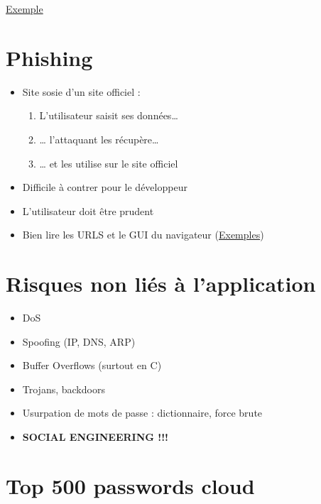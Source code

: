 \href{https://www.owasp.org/index.php/CSRF}{Exemple}

\hypertarget{phishing}{%
\section{Phishing}\label{phishing}}

\begin{itemize}
\tightlist
\item
  Site sosie d'un site officiel :

  \begin{enumerate}
  \def\labelenumi{\arabic{enumi}.}
  \tightlist
  \item
    L'utilisateur saisit ses données\ldots{}
  \item
    \ldots{} l'attaquant les récupère\ldots{}
  \item
    \ldots{} et les utilise sur le site officiel
  \end{enumerate}
\item
  Difficile à contrer pour le développeur
\item
  L'utilisateur doit être prudent
\item
  Bien lire les URLS et le GUI du navigateur
  (\href{http://kb.cadzow.com.au:15384/cadzow/details.aspx?ID=1422}{Exemples})
\end{itemize}

\hypertarget{risques-non-liuxe9s-uxe0-lapplication}{%
\section{Risques non liés à
l'application}\label{risques-non-liuxe9s-uxe0-lapplication}}

\begin{itemize}
\tightlist
\item
  DoS
\item
  Spoofing (IP, DNS, ARP)
\item
  Buffer Overflows (surtout en C)
\item
  Trojans, backdoors
\item
  Usurpation de mots de passe : dictionnaire, force brute
\item
  \textbf{SOCIAL ENGINEERING !!!}
\end{itemize}

\hypertarget{top-500-passwords-cloud}{%
\section{Top 500 passwords cloud}\label{top-500-passwords-cloud}}

